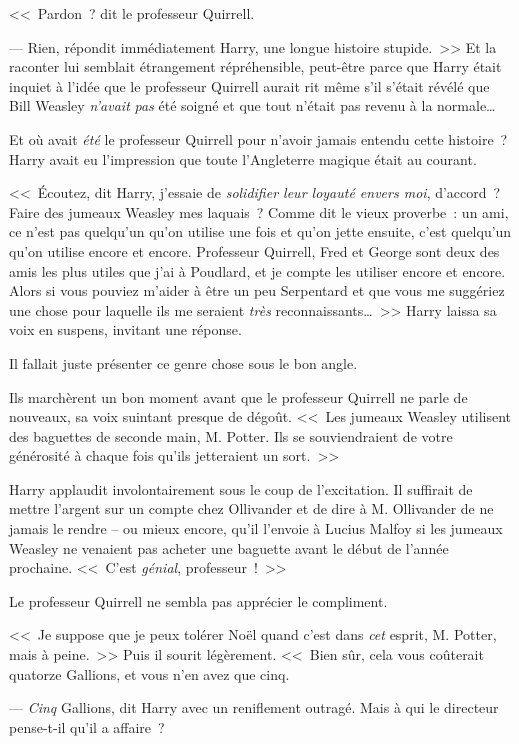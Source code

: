 <<~Pardon~? dit le professeur Quirrell.

--- Rien, répondit immédiatement Harry, une longue histoire stupide.~>> Et la raconter lui semblait étrangement répréhensible, peut-être parce que Harry était inquiet à l'idée que le professeur Quirrell aurait rit même s'il s'était révélé que Bill Weasley \emph{n'avait} \emph{pas} été soigné et que tout n'était pas revenu à la normale…

Et où avait \emph{été} le professeur Quirrell pour n'avoir jamais entendu cette histoire~? Harry avait eu l'impression que toute l'Angleterre magique était au courant.

<<~Écoutez, dit Harry, j'essaie de \emph{solidifier leur loyauté envers moi}, d'accord~? Faire des jumeaux Weasley mes laquais~? Comme dit le vieux proverbe~: un ami, ce n'est pas quelqu'un qu'on utilise une fois et qu'on jette ensuite, c'est quelqu'un qu'on utilise encore et encore. Professeur Quirrell, Fred et George sont deux des amis les plus utiles que j'ai à Poudlard, et je compte les utiliser encore et encore. Alors si vous pouviez m'aider à être un peu Serpentard et que vous me suggériez une chose pour laquelle ils me seraient \emph{très} reconnaissants…~>> Harry laissa sa voix en suspens, invitant une réponse.

Il fallait juste présenter ce genre chose sous le bon angle.

Ils marchèrent un bon moment avant que le professeur Quirrell ne parle de nouveaux, sa voix suintant presque de dégoût. <<~Les jumeaux Weasley utilisent des baguettes de seconde main, M. Potter. Ils se souviendraient de votre générosité à chaque fois qu'ils jetteraient un sort.~>>

Harry applaudit involontairement sous le coup de l'excitation. Il suffirait de mettre l'argent sur un compte chez Ollivander et de dire à M. Ollivander de ne jamais le rendre -- ou mieux encore, qu'il l'envoie à Lucius Malfoy si les jumeaux Weasley ne venaient pas acheter une baguette avant le début de l'année prochaine. <<~C'est \emph{génial}, professeur~!~>>

Le professeur Quirrell ne sembla pas apprécier le compliment.

<<~Je suppose que je peux tolérer Noël quand c'est dans \emph{cet} esprit, M. Potter, mais à peine.~>> Puis il sourit légèrement. <<~Bien sûr, cela vous coûterait quatorze Gallions, et vous n'en avez que cinq.

--- \emph{Cinq} Gallions, dit Harry avec un reniflement outragé. Mais à qui le directeur pense-t-il qu'il a affaire~?

